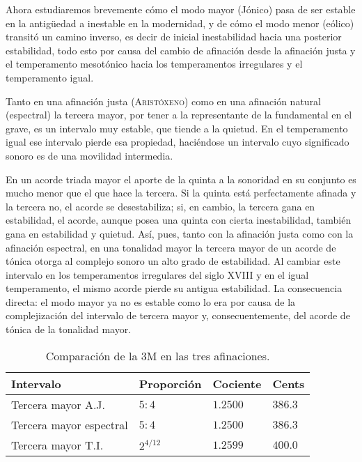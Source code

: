 \documentclass[a4paper,12pt]{article}
\begin{document}
\begin{multicols}{2}
  Ahora estudiaremos brevemente cómo el modo mayor (Jónico) pasa de ser estable en la antigüedad a inestable en la modernidad, y de cómo el modo menor (eólico) transitó un camino inverso, es decir de inicial inestabilidad hacia una posterior estabilidad, todo esto por causa del cambio de afinación desde la afinación justa y el temperamento mesotónico hacia los temperamentos irregulares y el temperamento igual.

  Tanto en una afinación justa (\textsc{Aristóxeno}) como en una afinación natural (espectral) la tercera mayor, por tener a la representante de la fundamental en el grave, es un intervalo muy estable, que tiende a la quietud. En el temperamento igual ese intervalo pierde esa propiedad, haciéndose un intervalo cuyo significado sonoro es de una movilidad intermedia.

  En un acorde triada mayor el aporte de la quinta a la sonoridad en su conjunto es mucho menor que el que hace la tercera. Si la quinta está perfectamente afinada y la tercera no, el acorde se desestabiliza; si, en cambio, la tercera gana en estabilidad, el acorde, aunque posea una quinta con cierta inestabilidad, también gana en estabilidad y quietud. Así, pues, tanto con la afinación justa como con la afinación espectral, en una tonalidad mayor la tercera mayor de un acorde de tónica otorga al complejo sonoro un alto grado de estabilidad. Al cambiar este intervalo en los temperamentos irregulares del siglo XVIII y en el igual temperamento, el mismo acorde pierde su antigua estabilidad. La consecuencia directa: el modo mayor ya no es estable como lo era por causa de la complejización del intervalo de tercera mayor y, consecuentemente, del acorde de tónica de la tonalidad mayor.
\end{multicols}

\begin{table}[ht]
  \centering
  \caption{Comparación de la 3M en las tres afinaciones.}\label{tab:3M}
  \begin{tabular}{@{}llll@{}}
  \toprule
  Intervalo               & Proporción  & Cociente  & Cents   \\ \midrule
  Tercera mayor A.J.      & $5:4$       & $1.2500$  & $386.3$ \\
  Tercera mayor espectral & $5:4$       & $1.2500$  & $386.3$ \\
  Tercera mayor T.I.      & $2^{4/12}$  & $1.2599$  & $400.0$ \\ \bottomrule
  \end{tabular}
\end{table}
\end{document}
